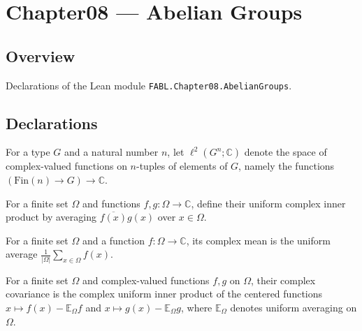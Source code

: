 \chapter{Chapter08 — Abelian Groups}
\section{Overview}

Declarations of the Lean module \texttt{FABL.Chapter08.AbelianGroups}.

\section{Declarations}

\begin{definition}
\label{FABL.AbelianL2}
\leanok
For a type $G$ and a natural number $n$, let $\ell^2(G^n;\mathbb{C})$ denote the space
of complex-valued functions on $n$-tuples of elements of $G$, namely the functions
$(\mathrm{Fin}(n)\to G)\to\mathbb{C}$.
\end{definition}

\begin{definition}
\label{FABL.complexUniformInner}
\leanok
For a finite set $\Omega$ and functions $f,g:\Omega\to\mathbb{C}$, define their uniform
complex inner product by averaging $\overline{f(x)}g(x)$ over $x\in\Omega$.
\end{definition}

\begin{definition}
\label{FABL.complexMean}
\leanok
For a finite set $\Omega$ and a function $f:\Omega\to\mathbb{C}$, its complex mean is
the uniform average $\frac{1}{|\Omega|}\sum_{x\in\Omega}f(x)$.
\end{definition}

\begin{definition}
\label{FABL.complexCovariance}
\leanok
{}
For a finite set $\Omega$ and complex-valued functions $f,g$ on $\Omega$, their complex
covariance is the complex uniform inner product of the centered functions $x\mapsto
f(x)-\mathbb{E}_{\Omega}f$ and $x\mapsto g(x)-\mathbb{E}_{\Omega}g$, where
$\mathbb{E}_{\Omega}$ denotes uniform averaging on $\Omega$.
\end{definition}

